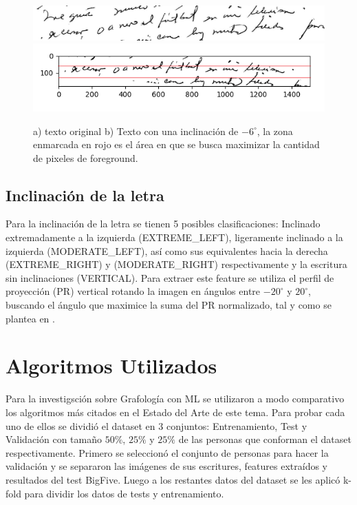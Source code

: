 \documentclass[10pt, a4paper]{article}
\begin{document}
            \begin{figure}[!h]
                \centering
                \includegraphics[width = 0.4\linewidth]{Judith_21.jpg}
                \includegraphics[width = 0.4\linewidth]{Baseline.png}
                \caption{a) texto original b) Texto con una inclinaci\'on de $-6^{\circ}$, la zona enmarcada en rojo es el \'area en que se busca maximizar 
                la cantidad de pixeles de foreground.}
            \end{figure}

        \subsection{Inclinaci\'on de la letra}
            Para la inclinaci\'on de la letra se tienen 5 posibles clasificaciones: Inclinado extremadamente a la izquierda (EXTREME\_LEFT), ligeramente inclinado a la 
            izquierda (MODERATE\_LEFT), as\'i como sus equivalentes hacia la derecha (EXTREME\_RIGHT) y (MODERATE\_RIGHT) respectivamente y la escritura sin inclinaciones (VERTICAL). 
            Para extraer este feature se utiliza el perfil de proyecci\'on (PR) vertical rotando la imagen en \'angulos entre $-20^{\circ}$ y $20^{\circ}$, buscando el \'angulo que maximice
            la suma del PR normalizado, tal y como se plantea en \cite{20}.

    \section{Algoritmos Utilizados}
        Para la investigsci\'on sobre Grafolog\'ia con ML se utilizaron a modo comparativo los algoritmos m\'as citados en el Estado del Arte de este tema. 
        Para probar cada uno de ellos se dividi\'o el dataset en 3 conjuntos: Entrenamiento, Test y Validaci\'on con tama\~no $50\%$, $25\%$ y $25\%$ de las personas que conforman el dataset respectivamente.
        Primero se seleccion\'o el conjunto de personas para hacer la validaci\'on y se separaron las im\'agenes de sus escritures, features extra\'idos y resultados del test BigFive. Luego a los restantes datos del dataset 
        se les aplic\'o k-fold para dividir los datos de tests y entrenamiento.  
\end{document}
